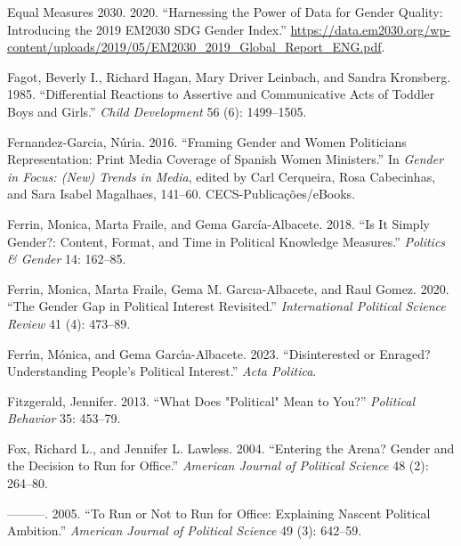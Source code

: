 \documentclass[
  letterpaper,
  DIV=11,
  numbers=noendperiod]{scrreprt}
\newlength{\cslhangindent}
\newlength{\cslentryspacingunit} %
\newenvironment{CSLReferences}[2] %
 {%
  \setlength{\parindent}{0pt}
  \ifodd #1
  \let\oldpar\par
  \def\par{\hangindent=\cslhangindent\oldpar}
  \fi
  \setlength{\parskip}{#2\cslentryspacingunit}
 }%
 {}
\begin{document}
\begin{CSLReferences}{1}{0}
\leavevmode{}%
Equal Measures 2030. 2020. {``{Harnessing the Power of Data for Gender
Quality: Introducing the 2019 EM2030 SDG Gender Index}.''}
\url{https://data.em2030.org/wp-content/uploads/2019/05/EM2030_2019_Global_Report_ENG.pdf}.

\leavevmode{}%
Fagot, Beverly I., Richard Hagan, Mary Driver Leinbach, and Sandra
Kronsberg. 1985. {``{Differential Reactions to Assertive and
Communicative Acts of Toddler Boys and Girls}.''} \emph{Child
Development} 56 (6): 1499--1505.

\leavevmode{}%
Fernandez-Garcia, Núria. 2016. {``{Framing Gender and Women Politicians
Representation: Print Media Coverage of Spanish Women Ministers}.''} In
\emph{{Gender in Focus: (New) Trends in Media}}, edited by Carl
Cerqueira, Rosa Cabecinhas, and Sara Isabel Magalhaes, 141--60.
CECS-Publica{ç}{õ}es/eBooks.

\leavevmode{}%
Ferrin, Monica, Marta Fraile, and Gema García-Albacete. 2018. {``{Is It
Simply Gender?: Content, Format, and Time in Political Knowledge
Measures}.''} \emph{Politics \& Gender} 14: 162--85.

\leavevmode{}%
Ferrin, Monica, Marta Fraile, Gema M. Garcıa-Albacete, and Raul Gomez.
2020. {``{The Gender Gap in Political Interest Revisited}.''}
\emph{International Political Science Review} 41 (4): 473--89.

\leavevmode{}%
Ferrı́n, Mónica, and Gema Garcı́a-Albacete. 2023. {``{Disinterested or
Enraged? Understanding People's Political Interest}.''} \emph{Acta
Politica}.

\leavevmode{}%
Fitzgerald, Jennifer. 2013. {``{What Does "Political" Mean to You?}''}
\emph{Political Behavior} 35: 453--79.

\leavevmode{}%
Fox, Richard L., and Jennifer L. Lawless. 2004. {``{Entering the Arena?
Gender and the Decision to Run for Office}.''} \emph{American Journal of
Political Science} 48 (2): 264--80.

\leavevmode{}%
---------. 2005. {``{To Run or Not to Run for Office: Explaining Nascent
Political Ambition}.''} \emph{American Journal of Political Science} 49
(3): 642--59.


\end{CSLReferences}
\end{document}
